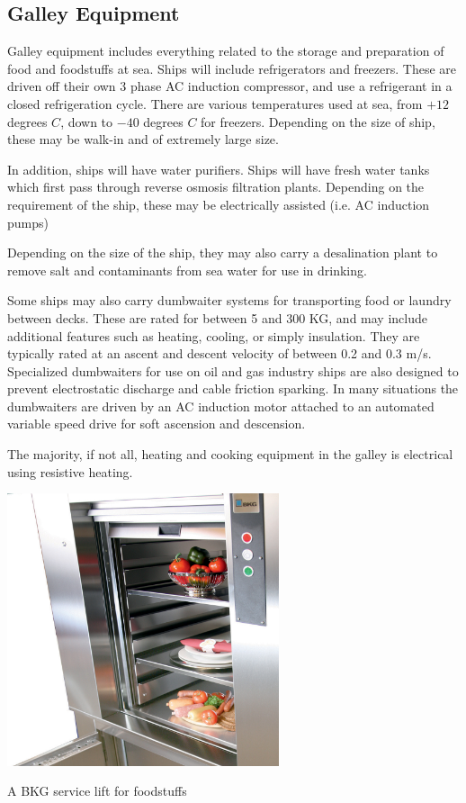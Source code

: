 \documentclass[11pt,a4paper]{article}
\begin{document}
\subsection{Galley Equipment}
Galley equipment includes everything related to the storage and preparation of food and foodstuffs at sea.
Ships will include refrigerators and freezers. These are driven off their own 3 phase AC induction compressor, and use a refrigerant in a closed refrigeration cycle. There are various temperatures used at sea, from $+12$ degrees $C$, down to $-40$ degrees $C$ for freezers. Depending on the size of ship, these may be walk-in and of extremely large size.

In addition, ships will have water purifiers. Ships will have fresh water tanks which first pass through reverse osmosis filtration plants. Depending on the requirement of the ship, these may be electrically assisted (i.e. AC induction pumps)

Depending on the size of the ship, they may also carry a desalination plant to remove salt and contaminants from sea water for use in drinking.

Some ships may also carry dumbwaiter systems for transporting food or laundry between decks. These are rated for between 5 and 300 KG, and may include additional features such as heating, cooling, or simply insulation. They are typically rated at an ascent and descent velocity of between 0.2 and 0.3 m/s. Specialized dumbwaiters for use on oil and gas industry ships are also designed to prevent electrostatic discharge and cable friction sparking. In many situations the dumbwaiters are driven by an AC induction motor attached to an automated variable speed drive for soft ascension and descension.

The majority, if not all, heating and cooking equipment in the galley is electrical using resistive heating.
\begin{center}
\includegraphics[width=8cm]{dumbwaiter}\par
A BKG service lift for foodstuffs
\end{center}
\end{document}
